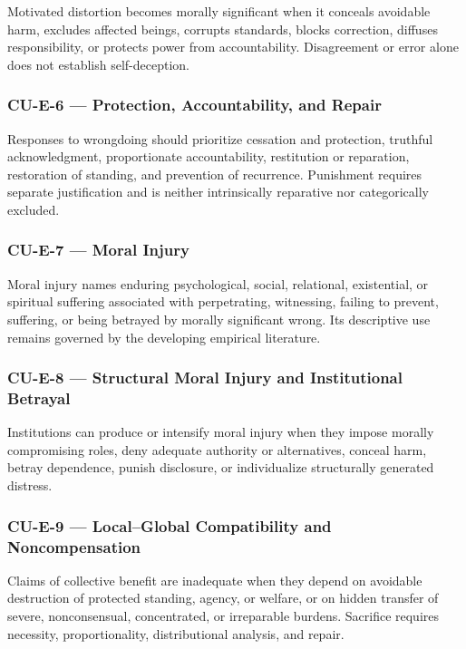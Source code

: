 \documentclass[
  11pt,
]{article}
\begin{document}
Motivated distortion becomes morally significant when it conceals
avoidable harm, excludes affected beings, corrupts standards, blocks
correction, diffuses responsibility, or protects power from
accountability. Disagreement or error alone does not establish
self-deception.

\subsubsection{CU-E-6 --- Protection, Accountability, and
Repair}\label{cu-e-6-protection-accountability-and-repair-1}

Responses to wrongdoing should prioritize cessation and protection,
truthful acknowledgment, proportionate accountability, restitution or
reparation, restoration of standing, and prevention of recurrence.
Punishment requires separate justification and is neither intrinsically
reparative nor categorically excluded.

\subsubsection{CU-E-7 --- Moral Injury}\label{cu-e-7-moral-injury-1}

Moral injury names enduring psychological, social, relational,
existential, or spiritual suffering associated with perpetrating,
witnessing, failing to prevent, suffering, or being betrayed by morally
significant wrong. Its descriptive use remains governed by the
developing empirical literature.

\subsubsection{CU-E-8 --- Structural Moral Injury and Institutional
Betrayal}\label{cu-e-8-structural-moral-injury-and-institutional-betrayal-1}

Institutions can produce or intensify moral injury when they impose
morally compromising roles, deny adequate authority or alternatives,
conceal harm, betray dependence, punish disclosure, or individualize
structurally generated distress.

\subsubsection{CU-E-9 --- Local--Global Compatibility and
Noncompensation}\label{cu-e-9-localglobal-compatibility-and-noncompensation-1}

Claims of collective benefit are inadequate when they depend on
avoidable destruction of protected standing, agency, or welfare, or on
hidden transfer of severe, nonconsensual, concentrated, or irreparable
burdens. Sacrifice requires necessity, proportionality, distributional
analysis, and repair.
\end{document}
